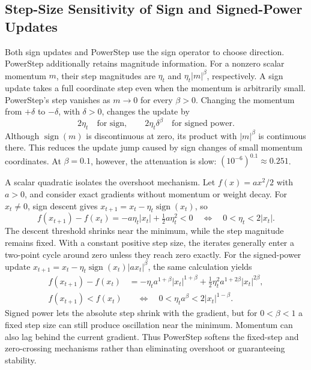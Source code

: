 \documentclass{article}
\begin{document}
\subsection{Step-Size Sensitivity of Sign and Signed-Power Updates}
\label{app:sign-sensitivity}
Both sign updates and PowerStep use the sign operator to choose direction. PowerStep additionally retains magnitude information. For a nonzero scalar momentum $m$, their step magnitudes are $\eta_t$ and $\eta_t|m|^\beta$, respectively. A sign update takes a full coordinate step even when the momentum is arbitrarily small. PowerStep's step vanishes as $m\to0$ for every $\beta>0$. Changing the momentum from $+\delta$ to $-\delta$, with $\delta>0$, changes the update by
\begin{equation}
2\eta_t \quad\text{for sign},\qquad
2\eta_t\delta^\beta \quad\text{for signed power}.
\end{equation}
Although $\operatorname{sign}(m)$ is discontinuous at zero, its product with $|m|^\beta$ is continuous there. This reduces the update jump caused by sign changes of small momentum coordinates. At $\beta=0.1$, however, the attenuation is slow: $(10^{-6})^{0.1}\approx0.251$.

A scalar quadratic isolates the overshoot mechanism. Let $f(x)=ax^2/2$ with $a>0$, and consider exact gradients without momentum or weight decay. For $x_t\ne0$, sign descent gives $x_{t+1}=x_t-\eta_t\operatorname{sign}(x_t)$, so
\begin{equation}
f(x_{t+1})-f(x_t)=-a\eta_t|x_t|+\tfrac12a\eta_t^2<0
\quad\Longleftrightarrow\quad 0<\eta_t<2|x_t|.
\end{equation}
The descent threshold shrinks near the minimum, while the step magnitude remains fixed. With a constant positive step size, the iterates generally enter a two-point cycle around zero unless they reach zero exactly. For the signed-power update $x_{t+1}=x_t-\eta_t\operatorname{sign}(x_t)|ax_t|^\beta$, the same calculation yields
\begin{align}
f(x_{t+1})-f(x_t)
&=-\eta_t a^{1+\beta}|x_t|^{1+\beta}
+\tfrac12\eta_t^2a^{1+2\beta}|x_t|^{2\beta},\\
f(x_{t+1})<f(x_t)
&\quad\Longleftrightarrow\quad 0<\eta_t a^\beta<2|x_t|^{1-\beta}.
\end{align}
Signed power lets the absolute step shrink with the gradient, but for $0<\beta<1$ a fixed step size can still produce oscillation near the minimum. Momentum can also lag behind the current gradient. Thus PowerStep softens the fixed-step and zero-crossing mechanisms rather than eliminating overshoot or guaranteeing stability.
\end{document}
